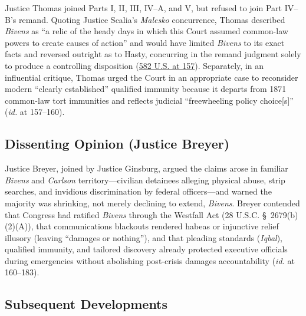\documentclass[12pt]{article}
\begin{document}
Justice Thomas joined Parts I, II, III, IV--A, and V, but refused to join Part IV--B's remand. Quoting Justice Scalia's \textit{Malesko} concurrence, Thomas described \textit{Bivens} as ``a relic of the heady days in which this Court assumed common-law powers to create causes of action'' and would have limited \textit{Bivens} to its exact facts and reversed outright as to Hasty, concurring in the remand judgment solely to produce a controlling disposition (\href{https://www.law.cornell.edu/supremecourt/text/15-1358}{582 U.S. at 157}). Separately, in an influential critique, Thomas urged the Court in an appropriate case to reconsider modern ``clearly established'' qualified immunity because it departs from 1871 common-law tort immunities and reflects judicial ``freewheeling policy choice[s]'' (\textit{id.} at 157--160).

\subsection{Dissenting Opinion (Justice Breyer)}

Justice Breyer, joined by Justice Ginsburg, argued the claims arose in familiar \textit{Bivens} and \textit{Carlson} territory---civilian detainees alleging physical abuse, strip searches, and invidious discrimination by federal officers---and warned the majority was shrinking, not merely declining to extend, \textit{Bivens}. Breyer contended that Congress had ratified \textit{Bivens} through the Westfall Act (28 U.S.C. \S~2679(b)(2)(A)), that communications blackouts rendered habeas or injunctive relief illusory (leaving ``damages or nothing''), and that pleading standards (\textit{Iqbal}), qualified immunity, and tailored discovery already protected executive officials during emergencies without abolishing post-crisis damages accountability (\textit{id.} at 160--183).

\subsection{Subsequent Developments}
\end{document}
